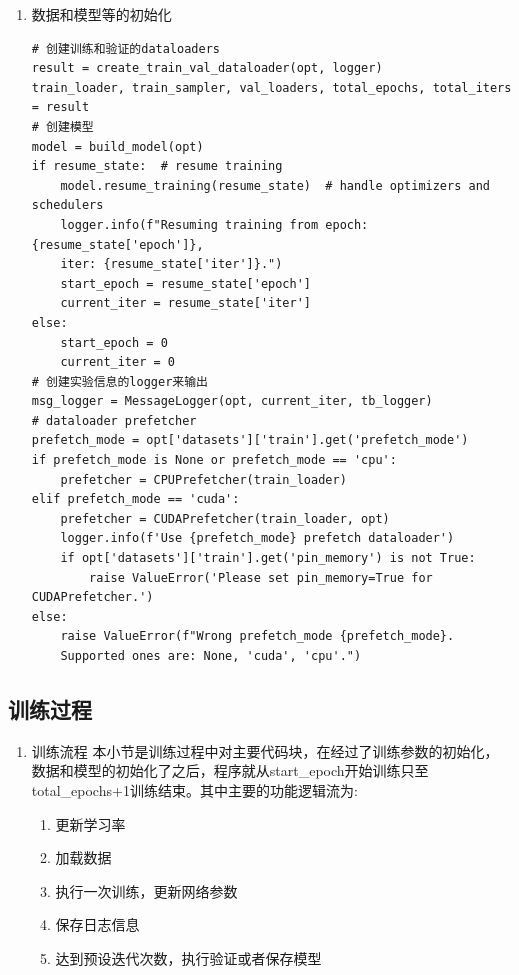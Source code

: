 \documentclass[../main.tex]{subfiles}
\begin{document}
\begin{enumerate}
\begin{enumerate}
\item 数据和模型等的初始化

\begin{verbatim}
# 创建训练和验证的dataloaders
result = create_train_val_dataloader(opt, logger)
train_loader, train_sampler, val_loaders, total_epochs, total_iters = result
# 创建模型
model = build_model(opt)
if resume_state:  # resume training
    model.resume_training(resume_state)  # handle optimizers and schedulers
    logger.info(f"Resuming training from epoch: {resume_state['epoch']},
    iter: {resume_state['iter']}.")
    start_epoch = resume_state['epoch']
    current_iter = resume_state['iter']
else:
    start_epoch = 0
    current_iter = 0
# 创建实验信息的logger来输出
msg_logger = MessageLogger(opt, current_iter, tb_logger)
# dataloader prefetcher
prefetch_mode = opt['datasets']['train'].get('prefetch_mode')
if prefetch_mode is None or prefetch_mode == 'cpu':
    prefetcher = CPUPrefetcher(train_loader)
elif prefetch_mode == 'cuda':
    prefetcher = CUDAPrefetcher(train_loader, opt)
    logger.info(f'Use {prefetch_mode} prefetch dataloader')
    if opt['datasets']['train'].get('pin_memory') is not True:
        raise ValueError('Please set pin_memory=True for CUDAPrefetcher.')
else:
    raise ValueError(f"Wrong prefetch_mode {prefetch_mode}.
    Supported ones are: None, 'cuda', 'cpu'.")

\end{verbatim}
\end{enumerate}

\subsection{训练过程}

\begin{enumerate}
\item 训练流程
本小节是训练过程中对主要代码块，在经过了训练参数的初始化，数据和模型的初始化了之后，程序就从start\_epoch开始训练只至total\_epochs+1训练结束。其中主要的功能逻辑流为:

\begin{enumerate}
\item 更新学习率
\item 加载数据
\item 执行一次训练，更新网络参数
\item 保存日志信息
\item 达到预设迭代次数，执行验证或者保存模型
\end{enumerate}


\end{enumerate}
\end{enumerate}
\end{document}

